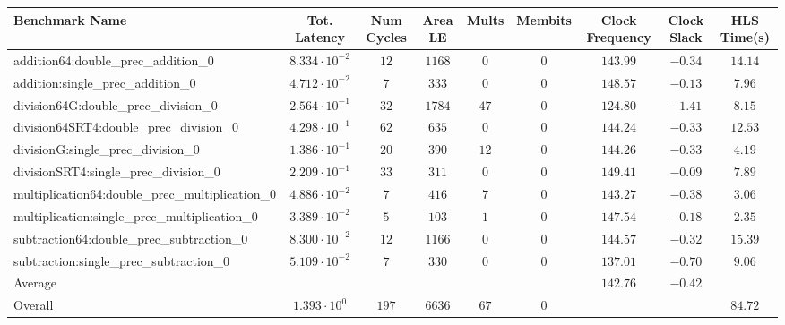 \begin{tabular}{|l|c|c|c|c|c|c|c|c|}
\hline
Benchmark Name                                   & Tot. Latency            & Num Cycles & Area LE  & Mults  & Membits & Clock Frequency & Clock Slack & HLS Time(s) \\
\hline
addition64:double\_prec\_addition\_0             & $ 8.334 \cdot 10^{-2} $ & $ 12     $ & $ 1168 $ & $ 0  $ & $ 0   $ & $ 143.99      $ & $ -0.34   $ & $ 14.14   $ \\
addition:single\_prec\_addition\_0               & $ 4.712 \cdot 10^{-2} $ & $ 7      $ & $ 333  $ & $ 0  $ & $ 0   $ & $ 148.57      $ & $ -0.13   $ & $ 7.96    $ \\
division64G:double\_prec\_division\_0            & $ 2.564 \cdot 10^{-1} $ & $ 32     $ & $ 1784 $ & $ 47 $ & $ 0   $ & $ 124.80      $ & $ -1.41   $ & $ 8.15    $ \\
division64SRT4:double\_prec\_division\_0         & $ 4.298 \cdot 10^{-1} $ & $ 62     $ & $ 635  $ & $ 0  $ & $ 0   $ & $ 144.24      $ & $ -0.33   $ & $ 12.53   $ \\
divisionG:single\_prec\_division\_0              & $ 1.386 \cdot 10^{-1} $ & $ 20     $ & $ 390  $ & $ 12 $ & $ 0   $ & $ 144.26      $ & $ -0.33   $ & $ 4.19    $ \\
divisionSRT4:single\_prec\_division\_0           & $ 2.209 \cdot 10^{-1} $ & $ 33     $ & $ 311  $ & $ 0  $ & $ 0   $ & $ 149.41      $ & $ -0.09   $ & $ 7.89    $ \\
multiplication64:double\_prec\_multiplication\_0 & $ 4.886 \cdot 10^{-2} $ & $ 7      $ & $ 416  $ & $ 7  $ & $ 0   $ & $ 143.27      $ & $ -0.38   $ & $ 3.06    $ \\
multiplication:single\_prec\_multiplication\_0   & $ 3.389 \cdot 10^{-2} $ & $ 5      $ & $ 103  $ & $ 1  $ & $ 0   $ & $ 147.54      $ & $ -0.18   $ & $ 2.35    $ \\
subtraction64:double\_prec\_subtraction\_0       & $ 8.300 \cdot 10^{-2} $ & $ 12     $ & $ 1166 $ & $ 0  $ & $ 0   $ & $ 144.57      $ & $ -0.32   $ & $ 15.39   $ \\
subtraction:single\_prec\_subtraction\_0         & $ 5.109 \cdot 10^{-2} $ & $ 7      $ & $ 330  $ & $ 0  $ & $ 0   $ & $ 137.01      $ & $ -0.70   $ & $ 9.06    $ \\
\hline
Average                                          & $                     $ & $        $ & $      $ & $    $ & $     $ & $ 142.76      $ & $ -0.42   $ & $         $ \\
\hline
Overall                                          & $ 1.393 \cdot 10^{0}  $ & $ 197    $ & $ 6636 $ & $ 67 $ & $ 0   $ & $             $ & $         $ & $ 84.72   $ \\
\hline
\end{tabular}
